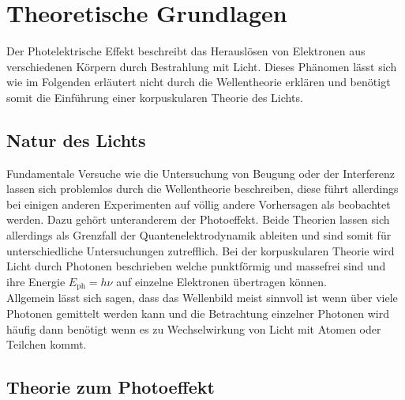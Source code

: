 \section{Theoretische Grundlagen}

Der Photelektrische Effekt beschreibt das Herauslösen von Elektronen aus verschiedenen Körpern durch Bestrahlung mit Licht. Dieses Phänomen lässt sich 
wie im Folgenden erläutert nicht durch die Wellentheorie erklären und benötigt somit die Einführung einer korpuskularen Theorie des Lichts.

\subsection{Natur des Lichts}

Fundamentale Versuche wie die Untersuchung von Beugung oder der Interferenz lassen sich problemlos durch die Wellentheorie beschreiben, diese führt allerdings bei einigen anderen Experimenten auf
völlig andere Vorhersagen als beobachtet werden. Dazu gehört unteranderem der Photoeffekt. Beide Theorien lassen sich allerdings als Grenzfall der Quantenelektrodynamik ableiten und sind somit für unterschiedliche 
Untersuchungen zutrefflich. Bei der korpuskularen Theorie wird Licht durch Photonen beschrieben welche punktförmig und massefrei sind und ihre Energie $E_{\text{ph}} = h\nu$ auf einzelne Elektronen übertragen können.
\\
Allgemein lässt sich sagen, dass das Wellenbild meist sinnvoll ist wenn über viele Photonen gemittelt werden kann und die Betrachtung einzelner Photonen wird häufig dann benötigt wenn es zu Wechselwirkung von Licht mit Atomen oder Teilchen kommt.

\subsection{Theorie zum Photoeffekt}

